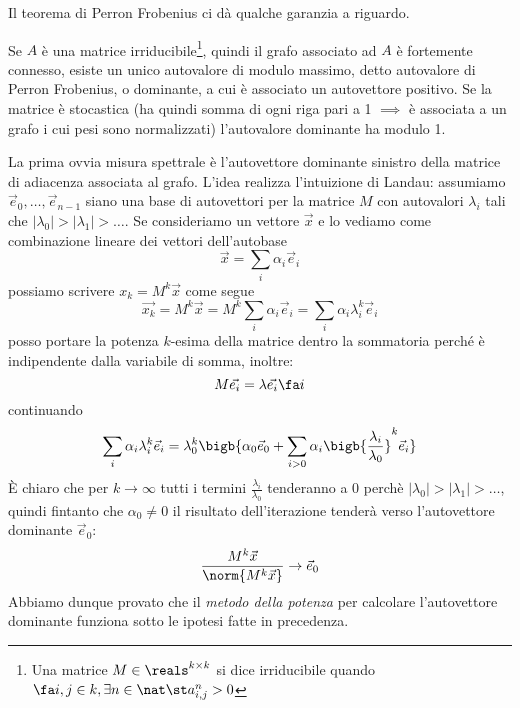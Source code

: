Il teorema di Perron Frobenius ci dà qualche garanzia a riguardo.
\begin{theorem}
	Se $A$ è una matrice irriducibile\footnote{Una matrice $M \in \reals^{k \times k}$ si dice irriducibile quando $\fa i, j \in k, \exists n \in \nat \st a_{i, j}^n > 0$}, quindi il grafo associato ad $A$ è fortemente connesso, esiste un unico autovalore di modulo massimo, detto autovalore di Perron Frobenius, o dominante, a cui è associato un autovettore positivo. Se la matrice è stocastica (ha quindi somma di ogni riga pari a 1 $\implies$ è associata a un grafo i cui pesi sono normalizzati) l'autovalore dominante ha modulo 1.
\end{theorem}
\noindent La prima ovvia misura spettrale è l'autovettore dominante sinistro della matrice di adiacenza associata al grafo. L'idea realizza l'intuizione di Landau: assumiamo $\vec{e}_0, \dots, \vec{e}_{n - 1}$ siano una base di autovettori per la matrice $M$ con autovalori $\lambda_i$ tali che $|\lambda_0| > |\lambda_1| > \dots$. Se consideriamo un vettore $\vec{x}$ e lo vediamo come combinazione lineare dei vettori dell'autobase
\begin{equation}
	\vec{x} = \sum_i{\alpha_i\vec{e}_i}
\end{equation}
possiamo scrivere $x_k = M^k\vec{x}$ come segue
\begin{equation}
	\vec{x_k} = M^k\vec{x} = M^k\sum_i{\alpha_i\vec{e}_i} = \sum_i{\alpha_i \lambda_i^k \vec{e}_i}
\end{equation}
posso portare la potenza $k$-esima della matrice dentro la sommatoria perché è indipendente dalla variabile di somma, inoltre:
\begin{equation}
	M\vec{e_i} = \lambda \vec{e_i} \fa i
\end{equation}
continuando
\begin{equation}
	\sum_i{\alpha_i \lambda_i^k \vec{e}_i} = \lambda_0^k\bigb{\alpha_0\vec{e}_0 + \sum_{i > 0}{\alpha_i\bigb{\frac{\lambda_i}{\lambda_0}}^k\vec{e}_i}}
\end{equation}
È chiaro che per $k \to \infty$ tutti i termini $\frac{\lambda_i}{\lambda_0}$ tenderanno a 0 perchè $|\lambda_0| > |\lambda_1| > \dots$, quindi fintanto che $\alpha_0 \neq 0$ il risultato dell'iterazione tenderà verso l'autovettore dominante $\vec{e}_0$:
\begin{equation}
	\frac{M^k\vec{x}}{\norm{M^k\vec{x}}} \to \vec{e}_0
\end{equation}
Abbiamo dunque provato che il \textit{metodo della potenza} per calcolare l'autovettore dominante funziona sotto le ipotesi fatte in precedenza.

